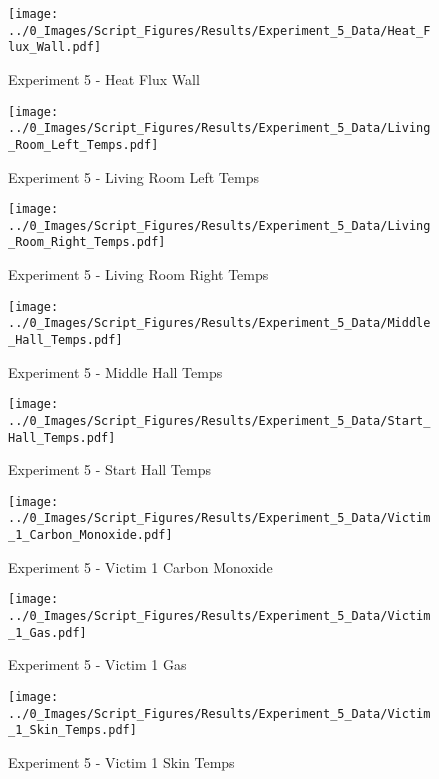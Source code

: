 	\clearpage

	\begin{figure}[H]
		\centering
		\texttt{[image: ../0\_Images/Script\_Figures/Results/Experiment\_5\_Data/Heat\_Flux\_Wall.pdf]}
		\caption[]{Experiment 5 - Heat Flux Wall}
	\end{figure}
 

	\begin{figure}[H]
		\centering
		\texttt{[image: ../0\_Images/Script\_Figures/Results/Experiment\_5\_Data/Living\_Room\_Left\_Temps.pdf]}
		\caption[]{Experiment 5 - Living Room Left Temps}
	\end{figure}
 
	\clearpage

	\begin{figure}[H]
		\centering
		\texttt{[image: ../0\_Images/Script\_Figures/Results/Experiment\_5\_Data/Living\_Room\_Right\_Temps.pdf]}
		\caption[]{Experiment 5 - Living Room Right Temps}
	\end{figure}
 

	\begin{figure}[H]
		\centering
		\texttt{[image: ../0\_Images/Script\_Figures/Results/Experiment\_5\_Data/Middle\_Hall\_Temps.pdf]}
		\caption[]{Experiment 5 - Middle Hall Temps}
	\end{figure}
 
	\clearpage

	\begin{figure}[H]
		\centering
		\texttt{[image: ../0\_Images/Script\_Figures/Results/Experiment\_5\_Data/Start\_Hall\_Temps.pdf]}
		\caption[]{Experiment 5 - Start Hall Temps}
	\end{figure}
 

	\begin{figure}[H]
		\centering
		\texttt{[image: ../0\_Images/Script\_Figures/Results/Experiment\_5\_Data/Victim\_1\_Carbon\_Monoxide.pdf]}
		\caption[]{Experiment 5 - Victim 1 Carbon Monoxide}
	\end{figure}
 
	\clearpage

	\begin{figure}[H]
		\centering
		\texttt{[image: ../0\_Images/Script\_Figures/Results/Experiment\_5\_Data/Victim\_1\_Gas.pdf]}
		\caption[]{Experiment 5 - Victim 1 Gas}
	\end{figure}
 

	\begin{figure}[H]
		\centering
		\texttt{[image: ../0\_Images/Script\_Figures/Results/Experiment\_5\_Data/Victim\_1\_Skin\_Temps.pdf]}
		\caption[]{Experiment 5 - Victim 1 Skin Temps}
	\end{figure}
 
